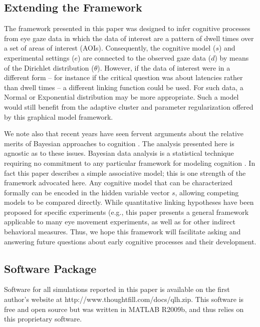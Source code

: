 \documentclass[12pt]{article}
\begin{document}
\subsection*{Extending the Framework}

	The framework presented in this paper was designed to infer cognitive processes from eye gaze data in which the data of interest are a pattern of dwell times over a set of areas of interest (AOIs). Consequently, the cognitive model ($s$) and experimental settings ($e$) are connected to the observed gaze data ($d$) by means of the Dirichlet distribution ($\theta$). However, if the data of interest were in a different form -- for instance if the critical question was about latencies rather than dwell times -- a different linking function could be used. For such data, a Normal or Exponential distribution may be more appropriate. Such a model would still benefit from the adaptive cluster and parameter regularization offered by this graphical model framework.

	We note also that recent years have seen fervent arguments about the relative merits of Bayesian approaches to cognition \cite{McClelland2010, Griffiths2010, Jones2011}. The analysis presented here is agnostic as to these issues. Bayesian data analysis is a statistical technique requiring no commitment to any particular framework for modeling cognition \cite{Kruschke2010a, Kruschke2011}. In fact this paper describes a simple associative model; this is one strength of the framework advocated here. Any cognitive model that can be characterized formally can be encoded in the hidden variable vector $s$, allowing competing models to be compared directly.  While quantitative linking hypotheses have been proposed for specific experiments (e.g.\cite{Yu2011a, Gilmore2002}, this paper presents a general framework applicable to many eye movement experiments, as well as for other indirect behavioral measures. Thus, we hope this framework will facilitate asking and answering future questions about early cognitive processes and their development.

\subsection*{Software Package}

	Software for all simulations reported in this paper is available on the first author’s website at http://www.thoughtfill.com/docs/qlh.zip. This software is free and open source but was written in MATLAB R2009b, and thus relies on this proprietary software. 
\end{document}
